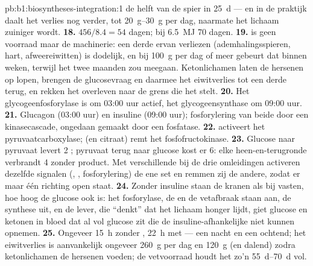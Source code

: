 \begin{solution}{pb:b1:biosyntheses-integration:1}
de helft van de spier in \qty{25}{d} --- en in de praktijk daalt het verlies nog
verder, tot \qtyrange{20}{30}{g} per dag, naarmate het lichaam zuiniger wordt.
\textbf{18.} $456/8.4 = 54$ dagen; bij \qty{6.5}{MJ} 70 dagen.
\textbf{19.}  is geen voorraad maar de machinerie: een derde ervan verliezen
(ademhalingsspieren, hart, afweereiwitten) is dodelijk, en bij \qty{100}{g} per dag
of meer gebeurt dat binnen weken, terwijl het  twee maanden zou meegaan.
Ketonlichamen laten de hersenen op  lopen, brengen de glucosevraag en daarmee
het eiwitverlies tot een derde terug, en rekken het overleven naar de grens die het
 stelt.
\textbf{20.} Het glycogeenfosforylase is om 03:00 uur actief, het
glycogeensynthase om 09:00 uur.
\textbf{21.} Glucagon (03:00 uur) en insuline (09:00 uur); fosforylering van beide
 door een kinasecascade, ongedaan gemaakt door een fosfatase.
\textbf{22.}  activeert het pyruvaatcarboxylase;  (en citraat) remt
het fosfofructokinase.
\textbf{23.} Glucose naar pyruvaat levert 2 ; pyruvaat terug naar glucose kost
er 6: elke heen-en-terugronde verbrandt 4  zonder product. Met verschillende
 bij de drie omleidingen activeren dezelfde signalen (, ,
fosforylering) de ene set en remmen zij de andere, zodat er maar één richting open
staat.
\textbf{24.} Zonder insuline staan de kranen als bij vasten, hoe hoog de glucose
ook is: het fosforylase, de  en de vetafbraak staan aan, de synthese
uit, en de lever, die ``denkt'' dat het lichaam honger lijdt, giet glucose en
ketonen in bloed dat al vol glucose zit die de insuline-afhankelijke  niet
kunnen opnemen.
\textbf{25.} Ongeveer \qty{15}{h} zonder , \qty{22}{h} met --- een
nacht en een ochtend; het eiwitverlies is aanvankelijk ongeveer \qty{260}{g} per
dag en \qty{120}{g} (en dalend) zodra ketonlichamen de hersenen voeden; de
vetvoorraad houdt het zo'n \qtyrange{55}{70}{d} vol.
\end{solution}

